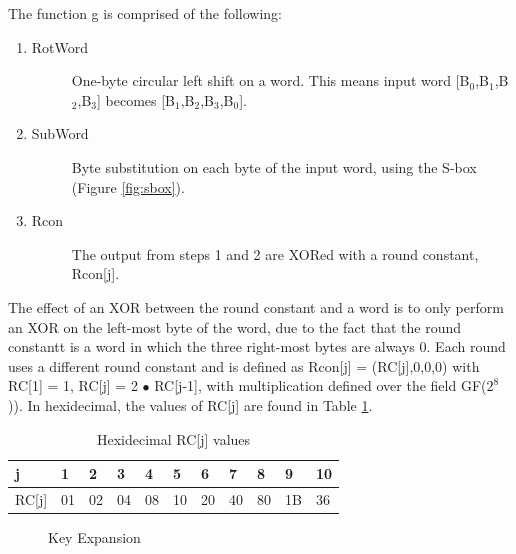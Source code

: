 \documentclass[a4paper,12pt]{report}
\begin{document}
The function g is comprised of the following:

\begin{enumerate}
 \item \begin{description}
  \item[RotWord] One-byte circular left shift on a word. This means input word [B$_{0}$,B$_{1}$,B$_{2}$,B$_{3}$] becomes [B$_{1}$,B$_{2}$,B$_{3}$,B$_{0}$].
 \end{description}
 \item \begin{description}
  \item[SubWord] Byte substitution on each byte of the input word, using the S-box (Figure \ref{fig:sbox}).
 \end{description}
 \item \begin{description}
  \item[Rcon] The output from steps 1 and 2 are XORed with a round constant, Rcon[j]. 
 \end{description}
\end{enumerate}

The effect of an XOR between the round constant and a word is to only perform an XOR on the left-most byte of the word, due to the fact that the round constantt is a word in which the three right-most bytes are always 0. Each round uses a different round constant and is defined as Rcon[j] = (RC[j],0,0,0) with RC[1] = 1, RC[j] = 2 $\bullet$ RC[j-1], with multiplication defined over the field GF($2^{8}$)). In hexidecimal, the values of RC[j] are found in Table \ref{tab:rcj}.

\begin{table}[h]
\begin{center}
    \begin{tabular}{| l | l | l | l | l | l | l | l | l | l | l |}
    \hline
    j & 1 & 2 & 3 & 4 & 5 & 6 & 7 & 8 & 9 & 10\\ \hline
    RC[j] & 01 & 02 & 04 & 08 & 10 & 20 & 40 & 80 & 1B & 36\\
    \hline
    \end{tabular}
   \caption{Hexidecimal RC[j] values}
    \label{tab:rcj}
\end{center}
\end{table} 

\begin{figure}[htb]
\centering

\caption{Key Expansion }
\label{fig:keyexpcode}
\end{figure}
\end{document}
